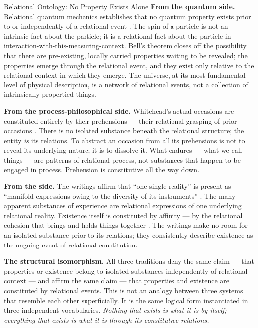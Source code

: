 \begin{convergencemoment}{Relational Ontology: No Property Exists Alone}
\textbf{From the quantum side.} Relational quantum mechanics establishes that no quantum property exists prior to or independently of a relational event \citep{Rovelli1996,Bell1964}. The spin of a particle is not an intrinsic fact about the particle; it is a relational fact about the particle-in-interaction-with-this-measuring-context. Bell's theorem closes off the possibility that there are pre-existing, locally carried properties waiting to be revealed; the properties emerge through the relational event, and they exist only relative to the relational context in which they emerge. The universe, at its most fundamental level of physical description, is a network of relational events, not a collection of intrinsically propertied things.

\textbf{From the process-philosophical side.} Whitehead's actual occasions are constituted entirely by their prehensions --- their relational grasping of prior occasions \citep{Whitehead1929}. There is no isolated substance beneath the relational structure; the entity \emph{is} its relations. To abstract an occasion from all its prehensions is not to reveal its underlying nature; it is to dissolve it. What endures --- what we call things --- are patterns of relational process, not substances that happen to be engaged in process. Prehension is constitutive all the way down.

\textbf{From the \bahai side.} The \bahai writings affirm that ``one single reality'' is present as ``manifold expressions owing to the diversity of its instruments'' \citep[para.~35]{SummonsLordHosts}. The many apparent substances of experience are relational expressions of one underlying relational reality. Existence itself is constituted by affinity --- by the relational cohesion that brings and holds things together \citep[Talk 41, Talk 48]{PUP}. The writings make no room for an isolated substance prior to its relations; they consistently describe existence as the ongoing event of relational constitution.

\textbf{The structural isomorphism.} All three traditions deny the same claim --- that properties or existence belong to isolated substances independently of relational context --- and affirm the same claim --- that properties and existence are constituted by relational events. This is not an analogy between three systems that resemble each other superficially. It is the same logical form instantiated in three independent vocabularies. \emph{Nothing that exists is what it is by itself; everything that exists is what it is through its constitutive relations.}
\end{convergencemoment}
